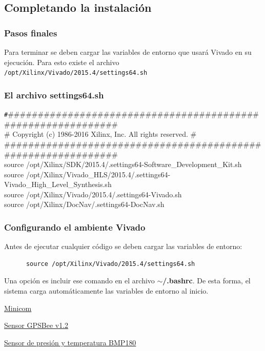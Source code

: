 \documentclass[a4paper,11pt]{article}
\begin{document}
\subsection{Completando la instalación}
\subsubsection{Pasos finales}
    Para terminar se deben cargar las variables de entorno que usará Vivado en
    su ejecución. Para esto existe el archivo
\texttt{/opt/Xilinx/Vivado/2015.4/settings64.sh}
\subsubsection{El archivo \textbf{settings64.sh}}
{\tiny{\texttt \#\#\#\#\#\#\#\#\#\#\#\#\#\#\#\#\#\#\#\#\#\#\#\#\#\#\#\#\#\#\#\#\#\#\#\#\#\#\#\#\#\#\#\#\#\#\#\#\#\#\#\#\#\#\#\#\#\#\#\#\#\#\\
      \# Copyright (c) 1986-2016 Xilinx, Inc.  All rights reserved. \#\\
      \#\#\#\#\#\#\#\#\#\#\#\#\#\#\#\#\#\#\#\#\#\#\#\#\#\#\#\#\#\#\#\#\#\#\#\#\#\#\#\#\#\#\#\#\#\#\#\#\#\#\#\#\#\#\#\#\#\#\#\#\#\#\\
      \vspace{4mm}
      source /opt/Xilinx/SDK/2015.4/.settings64-Software\_Development\_Kit.sh\\
      source
/opt/Xilinx/Vivado\_HLS/2015.4/.settings64-Vivado\_High\_Level\_Synthesis.sh\\
      source /opt/Xilinx/Vivado/2015.4/.settings64-Vivado.sh\\
      source /opt/Xilinx/DocNav/.settings64-DocNav.sh}}

\subsubsection{Configurando el ambiente Vivado}
    Antes de ejecutar cualquier código se deben cargar las variables de entorno:
    \begin{verbatim}
      source /opt/Xilinx/Vivado/2015.4/settings64.sh
    \end{verbatim}
    Una opción es incluir ese comando en el archivo \textbf{$\sim$/.bashrc}. De
esta
    forma, el sistema carga automáticamente las variables de entorno al inicio.

\begin{thebibliography}{9}

\href{https://es.wikipedia.org/wiki/Minicom}{Minicom}

\href{http://wiki.seeedstudio.com/GPS\_Bee\_kit/}{Sensor GPSBee v1.2}

\href{https://www.adafruit.com/product/1603}{Sensor de presión y temperatura
BMP180}


\end{thebibliography}
\end{document}
